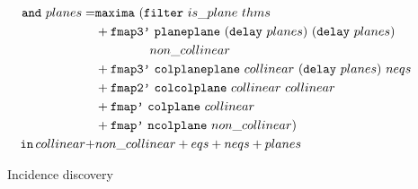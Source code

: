 \begin{figure}
\begin{align*}
\texttt{and}\ planes =& \texttt{maxima}\ (\texttt{filter}\ is\_plane\ thms\\
& + \texttt{fmap3'}\ \texttt{planeplane}\ (\texttt{delay}\ planes)\ (\texttt{delay}\ planes)\\
&\qquad\qquad\ non\_collinear\\
& + \texttt{fmap3'}\ \texttt{colplaneplane}\ collinear\ (\texttt{delay}\ planes)\ neqs\\
&+ \texttt{fmap2'}\ \texttt{colcolplane}\ collinear\ collinear\\
&+ \texttt{fmap'}\ \texttt{colplane}\ collinear\\
&+ \texttt{fmap'}\ \texttt{ncolplane}\ non\_collinear)\\
\quad \texttt{in}\,collinear + &non\_collinear + eqs + neqs + planes
\end{align*}
\caption{Incidence discovery}
\label{fig:IncidenceDiscoveryCode}
\end{figure}


